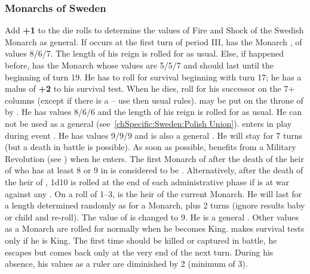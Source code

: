 \subsubsection{Monarchs of Sweden}
Add {\bf +1} to the die rolls to determine the values of Fire and Shock
of the Swedish Monarch as general.
 If  occurs
at the first turn of period III, \SUE has the Monarch , of values 8/6/7. The length of his reign is rolled for as usual.
 Else, if 
happened before, \SUE has the Monarch  whose values
are 5/5/7 and should last until the beginning of turn 19.  He has to
roll for survival beginning with turn 17; he has a malus of {\bf +2} to
his survival test.  When he dies, roll for his successor on the 7+
columns (except if there is a  -- use then usual
rules).
 may be put on the throne of \SUE by
. He has values 8/6/6 and the length
of his reign is rolled for as usual. He can not be used as a general
(see~\ref{chSpecific:Sweden:Polish Union}).
 enters in play during event
. He has values 9/9/9 and is also a general
. He will stay for 7 turns (but a death in
battle is possible). As soon as possible, \SUE benefits from a Military
Revolution (see ) when he enters.
\label{chSpecific:Sweden:Charles XII}
\bparag The first Monarch of \SUE after the death of the heir of
 who has at least 8 or 9 in \MIL is considered
to be .
\bparag Alternatively, after the death of the heir of , 1d10 is rolled at the end of each administrative phase if
\SUE is at war against any \MAJ. On a roll of 1--3,  is the heir of the current Monarch. He will last for a length
determined randomly as for a Monarch, plus 2 turns (ignore results baby
or child and re-roll).
\bparag The \MIL value of  is changed to 9. He is
a general . Other values as a Monarch are
rolled for normally when he becomes King.
\bparag {} makes survival tests only if he is King.
\bparag The first time  should be killed or
captured in battle, he escapes but comes back only at the very end of
the next turn. During his absence, his values as a ruler are diminished
by 2 (minimum of 3).

